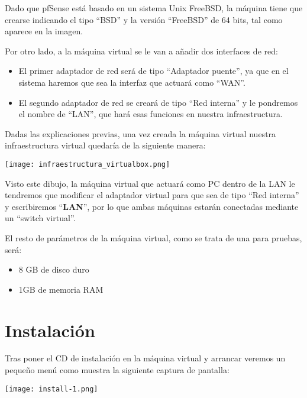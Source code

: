 Dado que pfSense está basado en un sistema Unix FreeBSD, la máquina tiene que crearse indicando el tipo “BSD” y la versión “FreeBSD” de 64 bits, tal como aparece en la imagen.

Por otro lado, a la máquina virtual se le van a añadir dos interfaces de red:

\begin{itemize}
    \item El primer adaptador de red será de tipo “Adaptador puente”, ya que en el sistema haremos que sea la interfaz que actuará como “WAN”.
    \item El segundo adaptador de red se creará de tipo “Red interna” y le pondremos el nombre de “LAN”, que hará esas funciones en nuestra infraestructura.
\end{itemize}

Dadas las explicaciones previas, una vez creada la máquina virtual nuestra infraestructura virtual quedaría de la siguiente manera:

\begin{center}
    \vspace{-10pt}
    \texttt{[image: infraestructura\_virtualbox.png]}
    \vspace{-20pt}
\end{center}

Visto este dibujo, la máquina virtual que actuará como PC dentro de la LAN le tendremos que modificar el adaptador virtual para que sea de tipo “Red interna” y escribiremos “\textbf{LAN}”, por lo que ambas máquinas estarán conectadas mediante un “switch virtual”.

El resto de parámetros de la máquina virtual, como se trata de una para pruebas, será:

\begin{itemize}
    \item 8 GB de disco duro
    \item 1GB de memoria RAM
\end{itemize}

\section{Instalación}
Tras poner el CD de instalación en la máquina virtual y arrancar veremos un pequeño menú como muestra la siguiente captura de pantalla:

\begin{center}
    \vspace{-10pt}
    \texttt{[image: install-1.png]}
    \vspace{-20pt}
\end{center}

